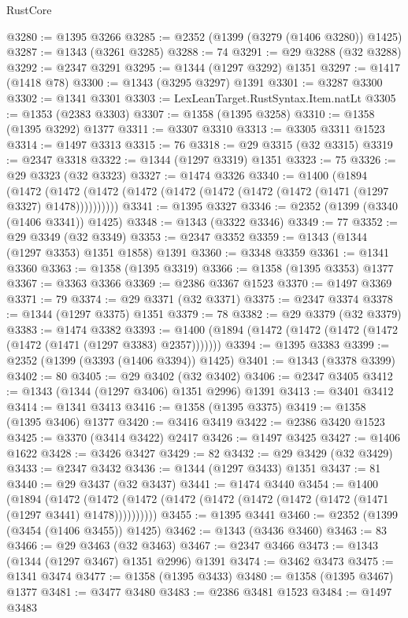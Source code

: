 \begin{lexlean}{RustCore}
\begin{coremodule}
@3280 := @1395 @3266
@3285 := @2352 (@1399 (@3279 (@1406 @3280)) @1425)
@3287 := @1343 (@3261 @3285)
@3288 := 74
@3291 := @29 @3288 (@32 @3288)
@3292 := @2347 @3291
@3295 := @1344 (@1297 @3292) @1351
@3297 := @1417 (@1418 @78)
@3300 := @1343 (@3295 @3297) @1391
@3301 := @3287 @3300
@3302 := @1341 @3301
@3303 := LexLeanTarget.RustSyntax.Item.natLt
@3305 := @1353 (@2383 @3303)
@3307 := @1358 (@1395 @3258)
@3310 := @1358 (@1395 @3292) @1377
@3311 := @3307 @3310
@3313 := @3305 @3311 @1523
@3314 := @1497 @3313
@3315 := 76
@3318 := @29 @3315 (@32 @3315)
@3319 := @2347 @3318
@3322 := @1344 (@1297 @3319) @1351
@3323 := 75
@3326 := @29 @3323 (@32 @3323)
@3327 := @1474 @3326
@3340 := @1400
    (@1894
      (@1472 (@1472 (@1472 (@1472 (@1472 (@1472 (@1472 (@1472 (@1471 (@1297 @3327) @1478))))))))))
@3341 := @1395 @3327
@3346 := @2352 (@1399 (@3340 (@1406 @3341)) @1425)
@3348 := @1343 (@3322 @3346)
@3349 := 77
@3352 := @29 @3349 (@32 @3349)
@3353 := @2347 @3352
@3359 := @1343 (@1344 (@1297 @3353) @1351 @1858) @1391
@3360 := @3348 @3359
@3361 := @1341 @3360
@3363 := @1358 (@1395 @3319)
@3366 := @1358 (@1395 @3353) @1377
@3367 := @3363 @3366
@3369 := @2386 @3367 @1523
@3370 := @1497 @3369
@3371 := 79
@3374 := @29 @3371 (@32 @3371)
@3375 := @2347 @3374
@3378 := @1344 (@1297 @3375) @1351
@3379 := 78
@3382 := @29 @3379 (@32 @3379)
@3383 := @1474 @3382
@3393 := @1400 (@1894 (@1472 (@1472 (@1472 (@1472 (@1472 (@1471 (@1297 @3383) @2357)))))))
@3394 := @1395 @3383
@3399 := @2352 (@1399 (@3393 (@1406 @3394)) @1425)
@3401 := @1343 (@3378 @3399)
@3402 := 80
@3405 := @29 @3402 (@32 @3402)
@3406 := @2347 @3405
@3412 := @1343 (@1344 (@1297 @3406) @1351 @2996) @1391
@3413 := @3401 @3412
@3414 := @1341 @3413
@3416 := @1358 (@1395 @3375)
@3419 := @1358 (@1395 @3406) @1377
@3420 := @3416 @3419
@3422 := @2386 @3420 @1523
@3425 := @3370 (@3414 @3422) @2417
@3426 := @1497 @3425
@3427 := @1406 @1622
@3428 := @3426 @3427
@3429 := 82
@3432 := @29 @3429 (@32 @3429)
@3433 := @2347 @3432
@3436 := @1344 (@1297 @3433) @1351
@3437 := 81
@3440 := @29 @3437 (@32 @3437)
@3441 := @1474 @3440
@3454 := @1400
    (@1894
      (@1472 (@1472 (@1472 (@1472 (@1472 (@1472 (@1472 (@1472 (@1471 (@1297 @3441) @1478))))))))))
@3455 := @1395 @3441
@3460 := @2352 (@1399 (@3454 (@1406 @3455)) @1425)
@3462 := @1343 (@3436 @3460)
@3463 := 83
@3466 := @29 @3463 (@32 @3463)
@3467 := @2347 @3466
@3473 := @1343 (@1344 (@1297 @3467) @1351 @2996) @1391
@3474 := @3462 @3473
@3475 := @1341 @3474
@3477 := @1358 (@1395 @3433)
@3480 := @1358 (@1395 @3467) @1377
@3481 := @3477 @3480
@3483 := @2386 @3481 @1523
@3484 := @1497 @3483

\end{coremodule}
\end{lexlean}
